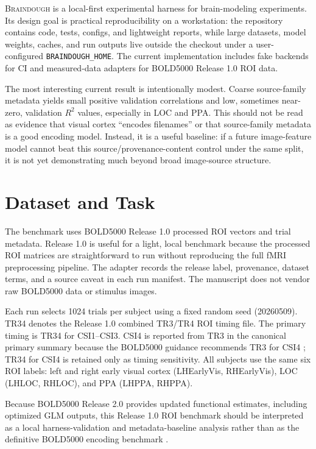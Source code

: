 \documentclass[11pt]{article}
\newcommand{\braindough}{\textsc{Braindough}}
\newcommand{\boldfive}{BOLD5000}
\newcommand{\rsq}{$R^2$}
\begin{document}
\braindough{} is a local-first experimental harness for brain-modeling
experiments. Its design goal is practical reproducibility on a workstation: the
repository contains code, tests, configs, and lightweight reports, while large
datasets, model weights, caches, and run outputs live outside the checkout under
a user-configured \texttt{BRAINDOUGH\_HOME}. The current implementation includes
fake backends for CI and measured-data adapters for \boldfive{} Release 1.0 ROI
data.

The most interesting current result is intentionally modest. Coarse
source-family metadata yields small positive validation correlations and low,
sometimes near-zero, validation \rsq{} values, especially in LOC and PPA. This
should not be read as evidence that visual
cortex ``encodes filenames'' or that source-family metadata is a good encoding
model. Instead, it is a useful baseline: if a future image-feature model cannot
beat this source/provenance-content control under the same split, it is not yet
demonstrating much beyond broad image-source structure.

\section{Dataset and Task}

The benchmark uses \boldfive{} Release 1.0 processed ROI vectors and trial
metadata. Release 1.0 is useful for a light, local benchmark because the
processed ROI matrices are straightforward to run without reproducing the full
fMRI preprocessing pipeline. The adapter records the release label, provenance,
dataset terms, and a source caveat in each run manifest. The manuscript does
not vendor raw \boldfive{} data or stimulus images.

Each run selects 1024 trials per subject using a fixed random seed
(20260509). TR34 denotes the Release 1.0 combined TR3/TR4 ROI timing file. The
primary timing is TR34 for CSI1--CSI3. CSI4 is reported from TR3 in the
canonical primary summary because the \boldfive{} guidance recommends TR3 for
CSI4 \cite{bold5000repo}; TR34 for CSI4 is retained only as timing sensitivity.
All subjects use the same six ROI labels: left and right early visual cortex
(LHEarlyVis, RHEarlyVis), LOC (LHLOC, RHLOC), and PPA (LHPPA, RHPPA).

Because \boldfive{} Release 2.0 provides updated functional estimates, including
optimized GLM outputs, this Release 1.0 ROI benchmark should be interpreted as a
local harness-validation and metadata-baseline analysis rather than as the
definitive \boldfive{} encoding benchmark \cite{bold5000repo}.
\end{document}
